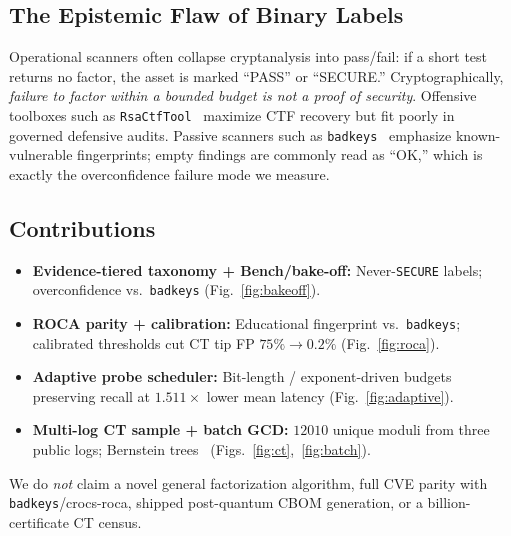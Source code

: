 \documentclass[conference]{IEEEtran}
\begin{document}
\subsection{The Epistemic Flaw of Binary Labels}
Operational scanners often collapse cryptanalysis into pass/fail: if a short test returns no factor, the asset is marked ``PASS'' or ``SECURE.'' Cryptographically, \textit{failure to factor within a bounded budget is not a proof of security}. Offensive toolboxes such as \texttt{RsaCtfTool}~\cite{rsactftool} maximize CTF recovery but fit poorly in governed defensive audits. Passive scanners such as \texttt{badkeys}~\cite{bock2022badkeys} emphasize known-vulnerable fingerprints; empty findings are commonly read as ``OK,'' which is exactly the overconfidence failure mode we measure.

\subsection{Contributions}
\begin{itemize}
    \item \textbf{Evidence-tiered taxonomy + Bench/bake-off:} Never-\texttt{SECURE} labels; overconfidence vs.\ \texttt{badkeys} (Fig.~\ref{fig:bakeoff}).
    \item \textbf{ROCA parity + calibration:} Educational fingerprint vs.\ \texttt{badkeys}; calibrated thresholds cut CT tip FP $75\%\!\rightarrow\!0.2\%$ (Fig.~\ref{fig:roca}).
    \item \textbf{Adaptive probe scheduler:} Bit-length / exponent-driven budgets preserving recall at $1.511\times$ lower mean latency (Fig.~\ref{fig:adaptive}).
    \item \textbf{Multi-log CT sample + batch GCD:} $12010$ unique moduli from three public logs; Bernstein trees~\cite{bernstein2004find} (Figs.~\ref{fig:ct},~\ref{fig:batch}).
\end{itemize}
We do \emph{not} claim a novel general factorization algorithm, full CVE parity with \texttt{badkeys}/crocs-roca, shipped post-quantum CBOM generation, or a billion-certificate CT census.
\end{document}

